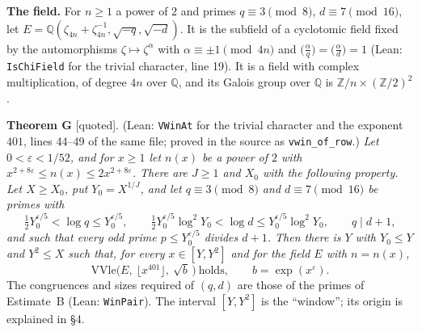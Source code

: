 \documentclass[11pt,letterpaper]{article}
\newcommand{\Z}{\mathbb Z}\newcommand{\Q}{\mathbb Q}\newcommand{\C}{\mathbb C}
\newcommand{\quoted}{\textsf{[quoted]}}
\begin{document}
\textbf{The field.} For $n\ge1$ a power of $2$ and primes $q\equiv3\pmod 8$, $d\equiv 7\pmod{16}$, let
$E=\Q(\zeta_{4n}+\zeta_{4n}^{-1},\sqrt{-q},\sqrt{-d})$. It is the subfield of a cyclotomic
field fixed by the automorphisms $\zeta\mapsto\zeta^{\alpha}$ with $\alpha\equiv\pm1\pmod{4n}$ and
$\big(\tfrac \alpha q\big)=\big(\tfrac \alpha d\big)=1$ (Lean: \texttt{IsChiField} for the trivial character,
line 19). It is a field with complex multiplication, of degree $4n$ over $\Q$, and its Galois group over $\Q$ is
$\Z/n\times(\Z/2)^2$.

\textbf{Theorem G} \quoted. (Lean: \texttt{VWinAt} for the trivial character and the exponent $401$,
lines 44--49 of the same file; proved in the source as \texttt{vwin\_of\_row}.) \emph{Let
$0<\varepsilon<1/52$, and for $x\ge1$ let $n(x)$ be a power of $2$ with
$x^{2+8\varepsilon}\le n(x)\le 2x^{2+8\varepsilon}$. There are $J\ge1$ and $X_0$ with the
following property. Let $X\ge X_0$, put $Y_0=X^{1/J}$, and let $q\equiv 3\pmod 8$ and $d\equiv7\pmod{16}$ be
primes with
\begin{equation}\label{D:331}
 \tfrac12Y_0^{\varepsilon/5}<\log q\le Y_0^{\varepsilon/5},\qquad
 \tfrac12Y_0^{\varepsilon/5}\log^2Y_0<\log d\le Y_0^{\varepsilon/5}\log^2Y_0,\qquad q\mid d+1,
\end{equation}
and such that every odd prime $p\le Y_0^{\varepsilon/5}$ divides $d+1$. Then there is $Y$ with
$Y_0\le Y$ and $Y^2\le X$ such that, for every $x\in[Y,Y^2]$ and for the field $E$ with $n=n(x)$,}
\begin{equation}\label{gc:G}
 \mathrm{VVle}\big(E,\ \lfloor x^{401}\rfloor,\ \sqrt b\,\big)\ \text{holds},\qquad b=\exp(x^{\varepsilon}).
\end{equation}
The congruences and sizes required of $(q,d)$ are those of the primes of Estimate~B (Lean:
\texttt{WinPair}). The interval $[Y,Y^2]$ is the ``window''; its origin is explained in \S4.
\end{document}
